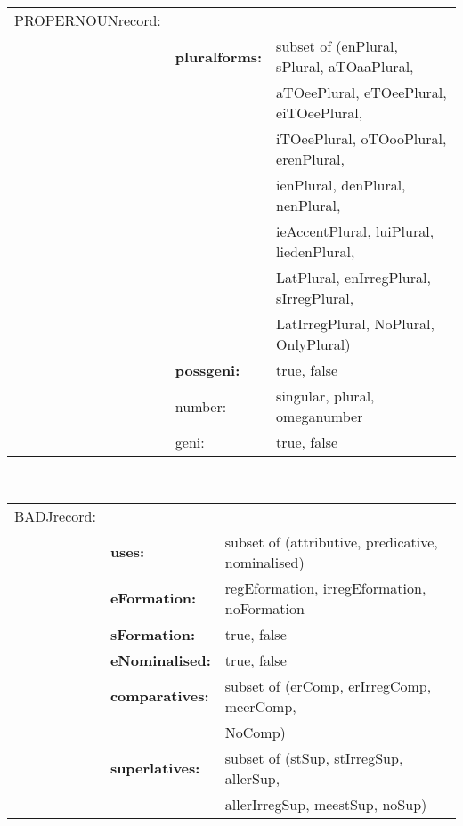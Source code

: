 \begin{tabular}{lll}
PROPERNOUNrecord: &            &              \\
             & {\bf pluralforms:} & subset of (enPlural, sPlural, aTOaaPlural,  \\
             &                 & aTOeePlural, eTOeePlural, eiTOeePlural,    \\
             &                 & iTOeePlural, oTOooPlural, erenPlural,      \\
             &                 & ienPlural, denPlural, nenPlural,           \\
             &                 & ieAccentPlural, luiPlural, liedenPlural,   \\
             &                 & LatPlural, enIrregPlural, sIrregPlural,    \\
             &                 & LatIrregPlural, NoPlural, OnlyPlural)      \\
             & {\bf possgeni:} & true, false                          \\
             & number:         & singular, plural, omeganumber        \\
             & geni:           & true, false                          \\
\end{tabular}
\\
\begin{tabular}{lll}
BADJrecord: &                     &              \\
            & {\bf uses:} & subset of (attributive, predicative, nominalised) \\
            & {\bf eFormation:}   & regEformation, irregEformation, noFormation \\
            & {\bf sFormation:}   & true, false \\
            & {\bf eNominalised:} & true, false \\
            & {\bf comparatives:} & subset of (erComp, erIrregComp, meerComp, \\
            &                           &     NoComp) \\
            & {\bf superlatives:} & subset of (stSup, stIrregSup, allerSup, \\
            &                     &  allerIrregSup, meestSup, noSup) \\
\end{tabular}
\\
